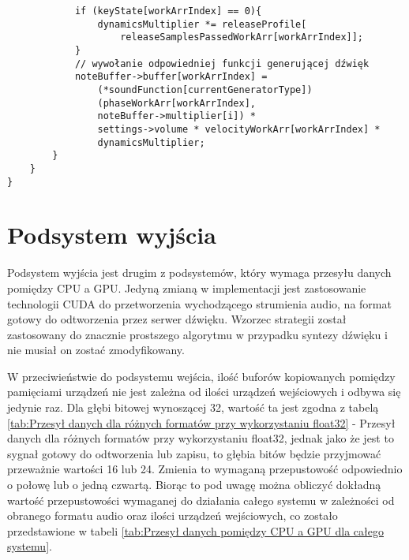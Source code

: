 \begin{lstlisting}
            if (keyState[workArrIndex] == 0){
                dynamicsMultiplier *= releaseProfile[
                    releaseSamplesPassedWorkArr[workArrIndex]];
            }
            // wywołanie odpowiedniej funkcji generującej dźwięk
            noteBuffer->buffer[workArrIndex] = 
                (*soundFunction[currentGeneratorType])
                (phaseWorkArr[workArrIndex],
                noteBuffer->multiplier[i]) *
                settings->volume * velocityWorkArr[workArrIndex] *
                dynamicsMultiplier;
        }
    }
}
\end{lstlisting}


\section{Podsystem wyjścia}

Podsystem wyjścia jest drugim z podsystemów, który wymaga przesyłu danych pomiędzy CPU a GPU. Jedyną zmianą w implementacji jest zastosowanie technologii CUDA do przetworzenia wychodzącego strumienia audio, na format gotowy do odtworzenia przez serwer dźwięku. Wzorzec strategii został zastosowany do znacznie prostszego algorytmu w przypadku syntezy dźwięku i nie musiał on zostać zmodyfikowany. 

\vspace{10pt}W przeciwieństwie do podsystemu wejścia, ilość buforów kopiowanych pomiędzy pamięciami urządzeń nie jest zależna od ilości urządzeń wejściowych i odbywa się jedynie raz. Dla głębi bitowej wynoszącej 32, wartość ta jest zgodna z tabelą \ref{tab:Przesył danych dla różnych formatów przy wykorzystaniu float32} - Przesył danych dla różnych formatów przy wykorzystaniu float32, jednak jako że jest to sygnał gotowy do odtworzenia lub zapisu, to głębia bitów będzie przyjmować przeważnie wartości 16 lub 24. Zmienia to wymaganą przepustowość odpowiednio o połowę lub o jedną czwartą. Biorąc to pod uwagę można obliczyć dokładną wartość przepustowości wymaganej do działania całego systemu w zależności od obranego formatu audio oraz ilości urządzeń wejściowych, co zostało przedstawione w tabeli \ref{tab:Przesył danych pomiędzy CPU a GPU dla całego systemu}.

